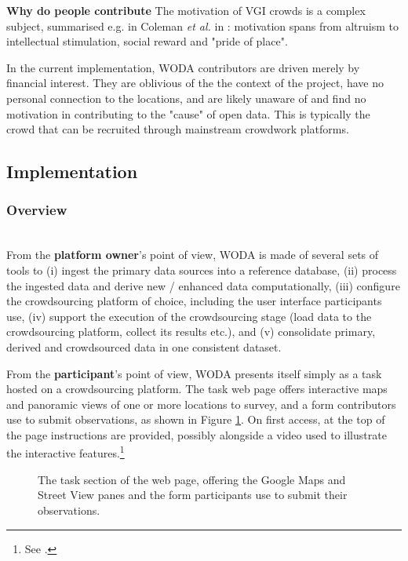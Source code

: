 \textbf{Why do people contribute} The motivation of VGI crowds is a complex subject, summarised e.g. in Coleman {\it et al.} in \cite{Coleman:2009vd}: motivation spans from altruism to intellectual stimulation, social reward and "pride of place".

In the current implementation, WODA contributors are driven merely by financial interest. They are oblivious of the the context of the project, have no personal connection to the locations, and are likely unaware of and find no motivation in contributing to the "cause" of open data. This is typically the crowd that can be recruited through mainstream crowdwork platforms. 

\subsection{Implementation}

\subsubsection{Overview} \leavevmode \\ %

From the \textbf{platform owner}'s point of view, WODA is made of several sets of tools to (i) ingest the primary data sources into a reference database, (ii) process the ingested data and derive new / enhanced data computationally, (iii) configure the crowdsourcing platform of choice, including the user interface participants use, (iv) support the execution of the crowdsourcing stage (load data to the crowdsourcing platform, collect its results etc.), and (v) consolidate primary, derived and crowdsourced data in one consistent dataset.

From the \textbf{participant}'s point of view, WODA presents itself simply as a task hosted on a crowdsourcing platform. The task web page offers interactive maps and panoramic views of one or more locations to survey, and a form contributors use to submit observations, as shown in Figure \ref{fig:virtual-survey-tool-01}. On first access, at the top of the page instructions are provided, possibly alongside a video used to illustrate the interactive features.\footnote{See \screenshotwithvideourl.}

\begin{figure}
	\caption{The task section of the web page, offering the Google Maps and Street View panes and the form participants use to submit their observations.}
	\label{fig:virtual-survey-tool-01}
\end{figure}

